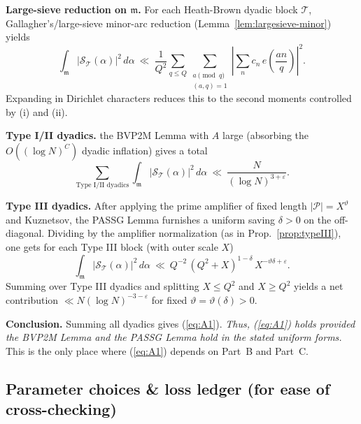 \documentclass[11pt]{article}
\def\eqref#1{(\ref{#1})}%
\theoremstyle{definition}
\theoremstyle{remark}
\numberwithin{equation}{part}
\begin{document}
\medskip
\noindent\textbf{Large-sieve reduction on $\mathfrak m$.} For each Heath-Brown dyadic block $\mathcal T$, Gallagher’s/large-sieve minor-arc reduction (Lemma~\ref{lem:largesieve-minor}) yields
\[
	\int_{\mathfrak m}\big|\mathcal S_{\mathcal T}(\alpha)\big|^2\,d\alpha
	\ \ll\ \frac{1}{Q^2}\sum_{q\le Q}\sum_{\substack{a\!\!\!\pmod q\\(a,q)=1}}
	\left|\sum_n c_n\,e\!\left(\frac{an}{q}\right)\right|^2.
\]
Expanding in Dirichlet characters reduces this to the second moments controlled by (i) and (ii).

\medskip
\noindent\textbf{Type I/II dyadics.} the BVP2M Lemma with $A$ large (absorbing the $O((\log N)^C)$ dyadic inflation) gives a total
\[
	\sum_{\text{Type I/II dyadics}}
	\int_{\mathfrak m}\big|\mathcal S_{\mathcal T}(\alpha)\big|^2\,d\alpha
	\ \ll\ \frac{N}{(\log N)^{3+\varepsilon}}.
\]

\medskip
\noindent\textbf{Type III dyadics.} After applying the prime amplifier of fixed length $|\mathcal P|=X^\vartheta$ and Kuznetsov, the PASSG Lemma furnishes a uniform saving $\delta>0$ on the off-diagonal. Dividing by the amplifier normalization (as in Prop.~\ref{prop:typeIII}), one gets for each Type III block (with outer scale $X$)
\[
	\int_{\mathfrak m}\big|\mathcal S_{\mathcal T}(\alpha)\big|^2\,d\alpha
	\ \ll\ Q^{-2}\,(Q^2+X)^{1-\delta}\,X^{-\vartheta\delta+\varepsilon}.
\]
Summing over Type III dyadics and splitting $X\le Q^2$ and $X\ge Q^2$ yields a net contribution $\ll N(\log N)^{-3-\varepsilon}$ for fixed $\vartheta=\vartheta(\delta)>0$.

\medskip
\noindent\textbf{Conclusion.} Summing all dyadics gives \eqref{eq:A1}. \emph{Thus, \eqref{eq:A1} holds provided the BVP2M Lemma and the PASSG Lemma hold in the stated uniform forms.} This is the only place where \eqref{eq:A1} depends on Part~B and Part~C.

\subsection{Parameter choices \& loss ledger (for ease of cross-checking)}
\end{document}
